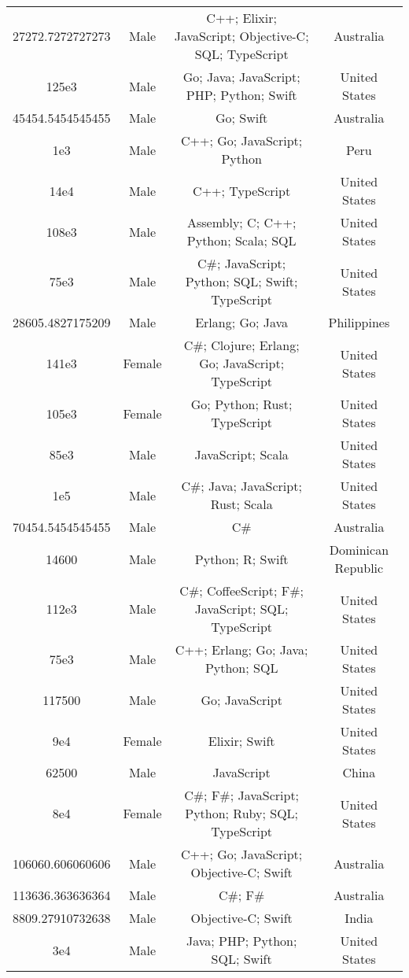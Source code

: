 \begin{center}
\begin{tabular}{ |c|c|c|c| }
27272.7272727273  &  Male  &  C++; Elixir; JavaScript; Objective-C; SQL; TypeScript  &  Australia  \\ 
125e3  &  Male  &  Go; Java; JavaScript; PHP; Python; Swift  &  United States  \\ 
45454.5454545455  &  Male  &  Go; Swift  &  Australia  \\ 
1e3  &  Male  &  C++; Go; JavaScript; Python  &  Peru  \\ 
14e4  &  Male  &  C++; TypeScript  &  United States  \\ 
108e3  &  Male  &  Assembly; C; C++; Python; Scala; SQL  &  United States  \\ 
75e3  &  Male  &  C\#; JavaScript; Python; SQL; Swift; TypeScript  &  United States  \\ 
28605.4827175209  &  Male  &  Erlang; Go; Java  &  Philippines  \\ 
141e3  &  Female  &  C\#; Clojure; Erlang; Go; JavaScript; TypeScript  &  United States  \\ 
105e3  &  Female  &  Go; Python; Rust; TypeScript  &  United States  \\ 
85e3  &  Male  &  JavaScript; Scala  &  United States  \\ 
1e5  &  Male  &  C\#; Java; JavaScript; Rust; Scala  &  United States  \\ 
70454.5454545455  &  Male  &  C\#  &  Australia  \\ 
14600  &  Male  &  Python; R; Swift  &  Dominican Republic  \\ 
112e3  &  Male  &  C\#; CoffeeScript; F\#; JavaScript; SQL; TypeScript  &  United States  \\ 
75e3  &  Male  &  C++; Erlang; Go; Java; Python; SQL  &  United States  \\ 
117500  &  Male  &  Go; JavaScript  &  United States  \\ 
9e4  &  Female  &  Elixir; Swift  &  United States  \\ 
62500  &  Male  &  JavaScript  &  China  \\ 
8e4  &  Female  &  C\#; F\#; JavaScript; Python; Ruby; SQL; TypeScript  &  United States  \\ 
106060.606060606  &  Male  &  C++; Go; JavaScript; Objective-C; Swift  &  Australia  \\ 
113636.363636364  &  Male  &  C\#; F\#  &  Australia  \\ 
8809.27910732638  &  Male  &  Objective-C; Swift  &  India  \\ 
3e4  &  Male  &  Java; PHP; Python; SQL; Swift  &  United States  \\ 

\end{tabular}
\end{center}
